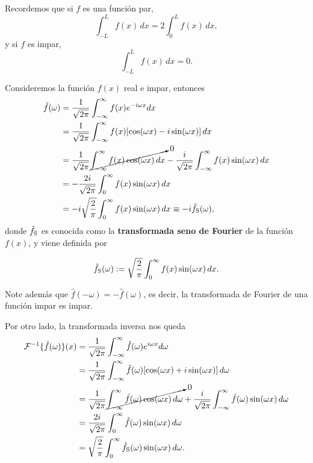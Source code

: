 Recordemos que si $f$ es una función par,
\begin{equation}
    \int_{-L}^{L} f(x) \,dx = 2 \int_{0}^{L} f(x) \,dx,
\end{equation}
y si $f$ es impar,
\begin{equation}
    \int_{-L}^{L} f(x) \,dx = 0.
\end{equation}

Consideremos la función $f(x)$ real e impar, entonces
\begin{align}
    \hat{f}(\omega) &= \frac{1}{\sqrt{2\pi}} \int_{-\infty}^{\infty} f(x) e^{-i\omega x} dx \nonumber \\
&= \frac{1}{\sqrt{2\pi}} \int_{-\infty}^{\infty} f(x) [\cos(\omega x) - i \sin(\omega x)] \,dx \nonumber \\
 &= \frac{1}{\sqrt{2\pi}} \cancelto{0}{\int_{-\infty}^{\infty} f(x) \cos(\omega x) \,dx}  - \frac{i}{\sqrt{2\pi}} \int_{-\infty}^{\infty} f(x) \sin(\omega x) \, dx \nonumber \\
     &= - \frac{2i}{\sqrt{2\pi}} \int_{0}^{\infty} f(x) \sin(\omega x) \, dx \nonumber \\
     &= - i \sqrt{\frac{2}{\pi}} \int_{0}^{\infty} f(x) \sin(\omega x) \,dx \equiv - i  \hat{f}_{\rm S}(\omega), 
\end{align}
donde $\hat{f}_{\rm S}$ es conocida como la \textbf{transformada seno de Fourier} de la función $f(x)$, y viene definida por \cite{Mauch} 
\begin{shaded}
    \begin{equation}
        \hat{f}_{\rm S}(\omega) := \sqrt{\frac{2}{\pi}} \int_{0}^{\infty} f(x) \sin(\omega x) \,dx.
    \end{equation}
\end{shaded}

Note además que $\hat{f}(-\omega) = - \hat{f}(\omega)$, es decir, la transformada de Fourier de una función impar es impar. 

Por otro lado, la transformada inversa nos queda
\begin{align}
    \mathcal{F}^{-1}\{\hat{f}(\omega)\}(x)  &= \frac{1}{\sqrt{2\pi}} \int_{-\infty}^{\infty} \hat{f}(\omega) e^{i\omega x} d\omega \nonumber \\
&= \frac{1}{\sqrt{2\pi}} \int_{-\infty}^{\infty} \hat{f}(\omega) [\cos(\omega x) + i \sin(\omega x)] \,d\omega \nonumber \\
 &= \frac{1}{\sqrt{2\pi}} \cancelto{0}{\int_{-\infty}^{\infty} \hat{f}(\omega) \cos(\omega x) \,d\omega}  + \frac{i}{\sqrt{2\pi}} \int_{-\infty}^{\infty} \hat{f}(\omega) \sin(\omega x) \, d\omega \nonumber \\
     &= \frac{2i}{\sqrt{2\pi}} \int_{0}^{\infty} \hat{f}(\omega) \sin(\omega x) \, d\omega \nonumber \\
     &= \sqrt{\frac{2}{\pi}} \int_{0}^{\infty} \hat{f}_{\rm S}(\omega) \sin(\omega x) \,d\omega. 
\end{align}

